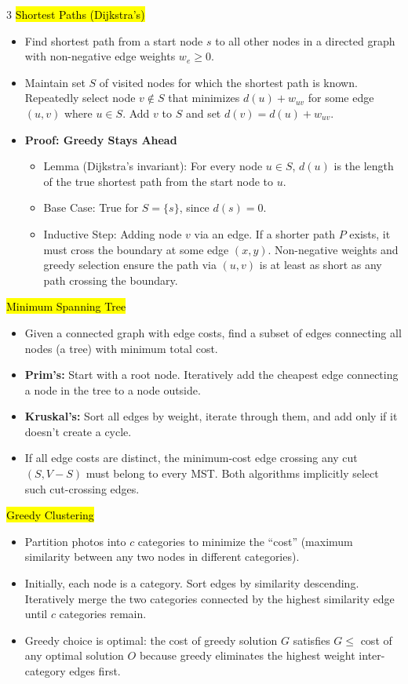 \documentclass[letterpaper]{article}
\begin{document}
\begin{multicols*}{3}
    \hl{Shortest Paths (Dijkstra's)}
    \begin{itemize}
        \item Find shortest path from a start node $s$ to all other nodes in a directed graph with non-negative edge weights $w_e \ge 0$.
        \item Maintain set $S$ of visited nodes for which the shortest path is known. Repeatedly select node $v \notin S$ that minimizes $d(u) + w_{uv}$ for some edge $(u,v)$ where $u \in S$. Add $v$ to $S$ and set $d(v) = d(u) + w_{uv}$.
        \item \textbf{Proof: Greedy Stays Ahead}
              \begin{itemize}
                  \item Lemma (Dijkstra's invariant): For every node $u \in S$, $d(u)$ is the length of the true shortest path from the start node to $u$.
                  \item Base Case: True for $S = \{s\}$, since $d(s) = 0$.
                  \item Inductive Step: Adding node $v$ via an edge. If a shorter path $P$ exists, it must cross the boundary at some edge $(x,y)$. Non-negative weights and greedy selection ensure the path via $(u,v)$ is at least as short as any path crossing the boundary.
              \end{itemize}
    \end{itemize}

    \hl{Minimum Spanning Tree}
    \begin{itemize}
        \item Given a connected graph with edge costs, find a subset of edges connecting all nodes (a tree) with minimum total cost.
        \item \textbf{Prim's:} Start with a root node. Iteratively add the cheapest edge connecting a node in the tree to a node outside.
        \item \textbf{Kruskal's:} Sort all edges by weight, iterate through them, and add only if it doesn’t create a cycle.
        \item If all edge costs are distinct, the minimum-cost edge crossing any cut $(S, V-S)$ must belong to every MST. Both algorithms implicitly select such cut-crossing edges.
    \end{itemize}

    \hl{Greedy Clustering}
    \begin{itemize}
        \item Partition photos into $c$ categories to minimize the ``cost'' (maximum similarity between any two nodes in different categories).
        \item Initially, each node is a category. Sort edges by similarity descending. Iteratively merge the two categories connected by the highest similarity edge until $c$ categories remain.
        \item Greedy choice is optimal: the cost of greedy solution $G$ satisfies $G \le$ cost of any optimal solution $O$ because greedy eliminates the highest weight inter-category edges first.
    \end{itemize}


\end{multicols*}
\end{document}
